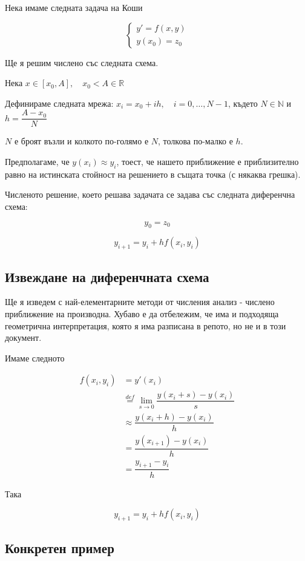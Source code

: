 \documentclass{scrartcl}
\begin{document}
Нека имаме следната задача на Коши

$$
\begin{cases}
y' = f(x, y)\\
y(x_0) = z_0
\end{cases}
$$

Ще я решим числено със следната схема.

Нека $x\in[x_0, A], \quad x_0<A\in\mathbb{R}$

Дефинираме следната мрежа: $x_i = x_0 + ih, \quad i = 0,\dots,N-1$, където $N\in\mathbb{N}$ и $h = \dfrac{A-x_0}{N}$

$N$ е броят възли и колкото по-голямо е $N$, толкова по-малко е $h$.

Предполагаме, че $y(x_i) \approx y_i$, тоест, че нашето приближение е приблизително равно на истинската стойност на решението в същата точка (с някаква грешка).

Численото решение, което решава задачата се задава със следната диференчна схема:

$$y_0 = z_0$$

$$y_{i+1} = y_{i} + h f(x_i, y_i)$$

\subsection{Извеждане на диференчната схема}

Ще я изведем с най-елементарните методи от числения анализ - числено приближение на производна. Хубаво е да отбележим, че има и подходяща геометрична интерпретация, която я има разписана в репото, но не и в този документ.

Имаме следното

\begin{align*}
\displaystyle f(x_i, y_i)
&= y'(x_i)\\
&\overset{def}{=} \displaystyle\lim_{s\to 0}\dfrac{y(x_i+s) - y(x_i)}{s}\\
&\approx \dfrac{y(x_i+h) - y(x_i)}{h}\\
&= \dfrac{y(x_{i+1}) - y(x_i)}{h}\\
&= \dfrac{y_{i+1} - y_i}{h}
\end{align*}

Така

$$y_{i+1} = y_i + h f(x_i, y_i)$$

\subsection{Конкретен пример}
\end{document}
